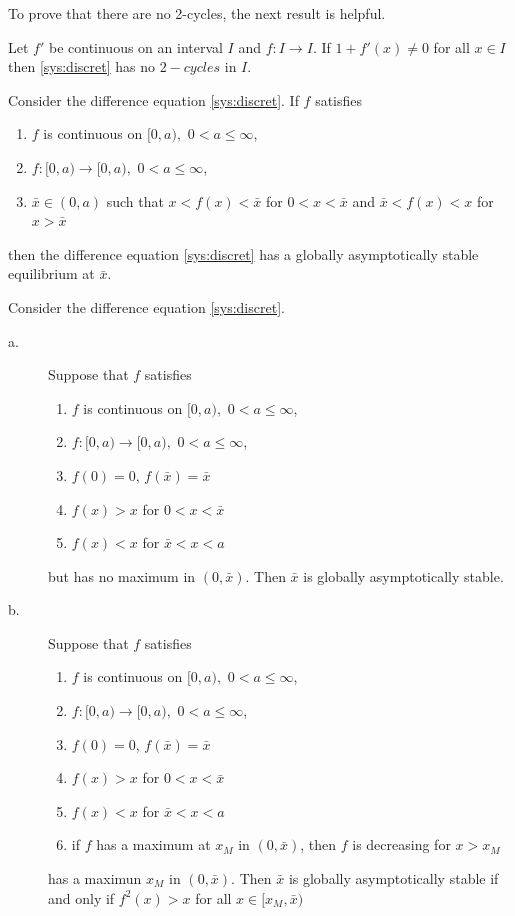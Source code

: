 To prove that there are no 2-cycles, the next result is helpful.
\begin{theorem}\label{th:no_cycles}
Let $f'$ be continuous on an interval $I$ and $f: I\rightarrow I$. If $1+f'(x)\not =0$ for all $x\in I$ then \eqref{sys:discret} has no $2-cycles$ in $I$.
\end{theorem}

\begin{theorem}\label{th:gas_3}
Consider the difference equation \eqref{sys:discret}. If $f$ satisfies
\begin{enumerate}
\item $f$ is continuous on $[0,a),$ $0<a\leq \infty$,
\item $f: [0,a)\rightarrow [0,a),$ $0<a\leq \infty$,
\item $\bar x \in (0,a)$ such that $x<f(x)<\bar x$ for $0<x<\bar x$
and $\bar x<f(x)< x$ for $x>\bar x$
\end{enumerate}
then the difference equation \eqref{sys:discret} has a globally asymptotically stable equilibrium at $\bar x$.
\end{theorem}


\begin{theorem}\label{th:FP_gas_discrete_4}
Consider the difference equation \eqref{sys:discret}.
\begin{description}
\item[a.]Suppose that $f$ satisfies
\begin{enumerate}
\item $f$ is continuous on $[0,a),$ $0<a\leq \infty$,
\item $f: [0,a)\rightarrow [0,a),$ $0<a\leq \infty$,
\item $f(0)=0$, $f(\bar x)=\bar x$ 
\item $f(x)>x$ for $0<x<\bar x$
\item $f(x)<x$ for $\bar x<x<a$
\end{enumerate}
but has no maximum in $(0,\bar x)$. Then $\bar x$ is globally asymptotically stable.
\item[b.]Suppose that $f$ satisfies
\begin{enumerate}
\item $f$ is continuous on $[0,a),$ $0<a\leq \infty$,
\item $f: [0,a)\rightarrow [0,a),$ $0<a\leq \infty$,
\item $f(0)=0$, $f(\bar x)=\bar x$ 
\item $f(x)>x$ for $0<x<\bar x$
\item $f(x)<x$ for $\bar x<x<a$
\item if $f$ has a maximum at $x_M$ in $(0,\bar x)$, then $f$ is decreasing for $x>x_M$
\end{enumerate}
has a maximun $x_M$ in $(0,\bar x)$. Then $\bar x$ is globally asymptotically stable if and only if $f^2(x)>x$ for all $x\in [x_M,\bar x)$
\end{description}
\end{theorem}



